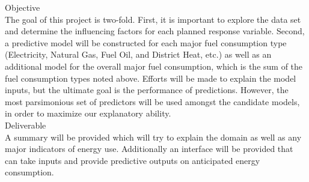 {\Large {Objective}}
\\[0.125in]
The goal of this project is two-fold.  First, it is important to explore the data set and determine the influencing factors for each planned response variable.  Second, a predictive model will be constructed for each major fuel consumption type (Electricity, Natural Gas, Fuel Oil, and District Heat, etc.) as well as an additional model for the overall major fuel consumption, which is the sum of the fuel consumption types noted above.  Efforts will be made to explain the model inputs, but the ultimate goal is the performance of predictions.  However, the most parsimonious set of predictors will be used amongst the candidate models, in order to maximize our explanatory ability.  
\\[0.25in]
{\Large {Deliverable}}
\\[0.125in]
A summary will be provided which will try to explain the domain as well as any major indicators of energy use. Additionally an interface will be provided that can take inputs and provide predictive outputs on anticipated energy consumption.